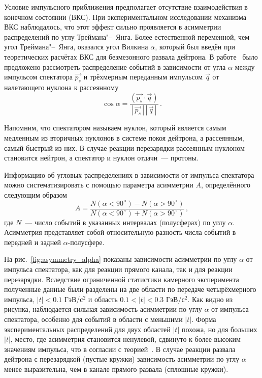 Условие импульсного приближения предполагает отсутствие взаимодействия в
конечном состоянии (ВКС). При экспериментальном исследовании механизма ВКС
наблюдалось, что этот эффект сильно проявляется в асимметрии распределений по
углу Треймана"--~Янга. Более естественной переменной, чем угол Треймана"--~Янга,
оказался угол Вилкина $\alpha$, который был введён при теоретических расчётах
ВКС для безмезонного развала дейтрона. В работе~\cite{alad77} было предложено
рассмотреть распределение событий в зависимости от угла $\alpha$ между импульсом
спектатора $\vec{p_s}$ и трёхмерным переданным импульсом $\vec{q}$ от
налетающего нуклона к рассеянному
\begin{equation}
  \cos{\alpha} = \frac{(\vec{p_s}\cdot\vec{q})}
  {|\,\vec{p_s}\,|\,|\,\vec{q}\,|}\,.
\end{equation}

Напомним, что спектатором называем нуклон, который является самым медленным из
вторичных нуклонов в системе покоя дейтрона, а рассеянным, самый быстрый из
них. В случае реакции перезарядки \dpchex рассеянным нуклоном становится
нейтрон, а спектатор и нуклон отдачи~--- протоны.

Информацию об угловых распределениях в зависимости от импульса спектатора можно
систематизировать с помощью параметра асимметрии $A$, определённого следующим
образом
\begin{equation}
  A = \frac{N(\alpha < 90^{\,\circ}) - N(\alpha > 90^{\,\circ})}
  {N(\alpha < 90^{\,\circ}) + N(\alpha > 90^{\,\circ})}\,,
\end{equation}
где $N$~--- число событий в указанных интервалах (полусферах) по углу
$\alpha$. Асимметрия представляет собой относительную разность числа событий в
передней и задней $\alpha$-полусфере.

На рис.~\ref{fig:asymmetry_alpha} показаны зависимости асимметрии по углу
$\alpha$ от импульса спектатора, как для реакции прямого канала, так и для
реакции перезарядки. Вследствие ограниченной статистики камерного эксперимента
полученные данные были разделены на две области по передаче четырёхмерного
импульса, $|t| < 0.1$ ГэВ/с$^2$ и область $0.1 < |t| < 0.3$ ГэВ/с$^2$. Как видно
из рисунка, наблюдается сильная зависимость асимметрии по углу $\alpha$ от
импульса спектатора, особенно для событий в области с меньшими $|t|$. Форма
экспериментальных распределений для двух областей $|t|$ похожа, но для больших
$|t|$, место, где асимметрия становится ненулевой, сдвинуто к более высоким
значениям импульса, что в согласии с теорией~\cite{alad77}. В случае реакции
развала дейтрона с перезарядкой (пустые кружки) зависимость асимметрии по углу
$\alpha$ менее выразительна, чем в канале прямого развала (сплошные кружки).

